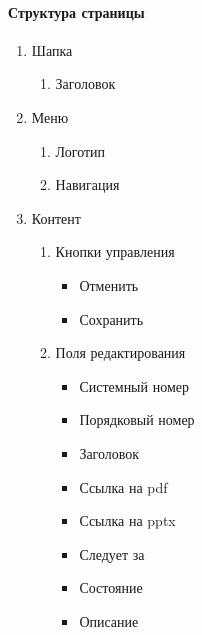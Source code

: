 \paragraph{Структура страницы}
\begin{enumerate}
	\item Шапка
	\begin{enumerate}
		\item Заголовок
	\end{enumerate}

	\item Меню
	\begin{enumerate}
		\item Логотип
		\item Навигация
	\end{enumerate}

	\item Контент
	\begin{enumerate}
		\item Кнопки управления
		\begin{itemize}
			\item Отменить
			\item Сохранить
		\end{itemize}
		\item Поля редактирования
		\begin{itemize}
			\item Системный номер
			\item Порядковый номер
			\item Заголовок
			\item Ссылка на pdf
			\item Ссылка на pptx
			\item Следует за
			\item Состояние
			\item Описание
		\end{itemize}
	\end{enumerate}
\end{enumerate}

